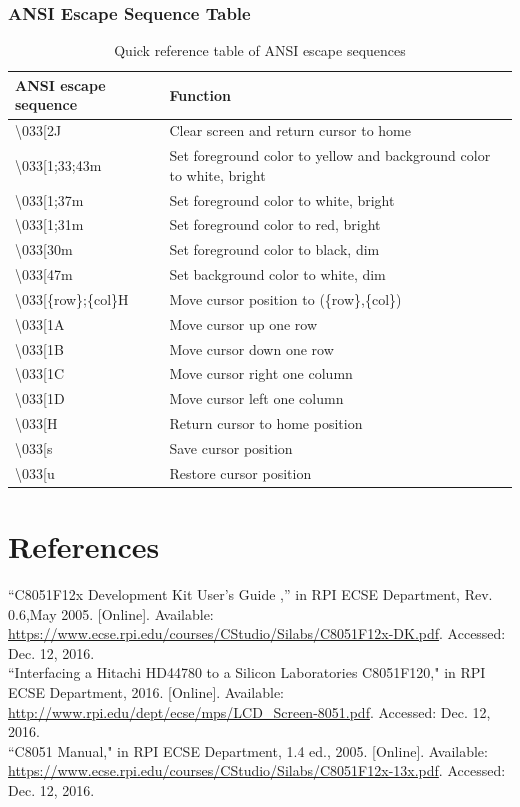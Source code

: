 \documentclass[12pt]{article}
\begin{document}
	\subsubsection{ANSI Escape Sequence Table}
	\begin{table}[h]
		\centering
		\begin{tabular}{|l|l|}
			\hline
			ANSI escape sequence & Function \\ \hline
			\textbackslash033[2J & Clear screen and return cursor to home \\ \hline
			\textbackslash033[1;33;43m & Set foreground color to yellow and background color to white, bright \\ \hline
			\textbackslash033[1;37m & Set foreground color to white, bright\\ \hline
			\textbackslash033[1;31m & Set foreground color to red, bright\\ \hline
			\textbackslash033[30m & Set foreground color to black, dim\\ \hline
			\textbackslash033[47m & Set background color to white, dim\\ \hline
			\textbackslash033[\{row\};\{col\}H & Move cursor position to (\{row\},\{col\})\\ \hline
			\textbackslash033[1A & Move cursor up one row \\ \hline
			\textbackslash033[1B & Move cursor down one row \\ \hline
			\textbackslash033[1C & Move cursor right one column \\ \hline
			\textbackslash033[1D & Move cursor left one column \\ \hline
			\textbackslash033[H & Return cursor to home position\\ \hline
			\textbackslash033[s & Save cursor position\\ \hline
			\textbackslash033[u & Restore cursor position\\ \hline
			
		\end{tabular}
		\caption{Quick reference table of ANSI escape sequences}
		\label{ANSI}
	\end{table}
	\section{References} 
	\noindent
	[1]``C8051F12x Development Kit User's Guide ,'' in RPI ECSE Department, Rev. 0.6,May 2005. [Online]. Available: \url{https://www.ecse.rpi.edu/courses/CStudio/Silabs/C8051F12x-DK.pdf}. Accessed: Dec. 12, 2016.\\
	\newline\noindent
	[2]``Interfacing a Hitachi HD44780 to a Silicon Laboratories C8051F120," in RPI ECSE Department, 2016. [Online]. Available: \url{http://www.rpi.edu/dept/ecse/mps/LCD_Screen-8051.pdf}. Accessed: Dec. 12, 2016.\\
	\newline\noindent
	[3]``C8051 Manual," in RPI ECSE Department, 1.4 ed., 2005. [Online]. Available: \url{https://www.ecse.rpi.edu/courses/CStudio/Silabs/C8051F12x-13x.pdf}. Accessed: Dec. 12, 2016.
	
	
\end{document}
